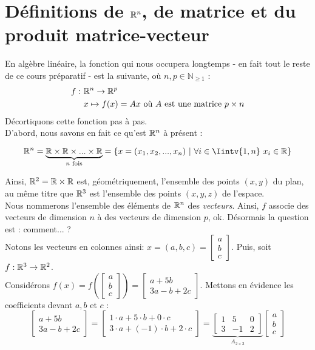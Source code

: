\section{Définitions de $\R^n$, de matrice et du produit matrice-vecteur}
\label{definitionProduitMatVec}
\noindent En algèbre linéaire, la fonction qui nous occupera longtemps - en fait tout le reste de ce cours préparatif - est la suivante, où $n,p \in \mathbb{N}_{\geq 1}$ :
\begin{align*}
    f: \ &\mathbb{R}^n \to \mathbb{R}^p\\
    &x \mapsto f(x) = Ax \text{ où $A$ est une matrice } p \times n
\end{align*}
Décortiquons cette fonction pas à pas.\\
D'abord, nous savons en fait ce qu'est $\R^n$ à présent : 
\begin{boxdef}[Espace $\R^n$]
$$\R^n = \underbrace{\R \times \R \times ... \times \R}_{n \text{ fois}} = \{x=(x_1, x_2, ..., x_n) \ | \ \forall i \in \Iintv{1, n}\ x_i \in \R\}$$
\end{boxdef}
Ainsi, $\mathbb{R}^2 = \mathbb{R} \times \mathbb{R}$ est, géométriquement, l'ensemble des points $(x,y)$ du plan, au même titre que $\mathbb{R}^3$ est l'ensemble des points $(x,y,z)$ de l'espace.\\
Nous nommerons l'ensemble des éléments de $\R^n$ des \textit{vecteurs}. Ainsi, $f$ associe des vecteurs de dimension $n$ à des vecteurs de dimension $p$, ok. Désormais la question est : comment... ?\\
Notons les vecteurs en colonnes ainsi: $x = (a,b,c) = \begin{bmatrix}a \\ b \\ c \end{bmatrix}$. Puis, soit $f: \mathbb{R}^3 \to \mathbb{R}^2$.\\
Considérons $f(x) = f\left(\begin{bmatrix}a \\ b \\ c \end{bmatrix} \right) = \begin{bmatrix}a+5b \\ 3a-b+2c \end{bmatrix}$. Mettons en évidence les coefficients devant $a, b$ et $c$ :
$$\begin{bmatrix}a+5b \\ 3a-b+2c \end{bmatrix} = \begin{bmatrix}1 \cdot a+5\cdot b + 0 \cdot c \\ 3 \cdot a + (-1) \cdot b+2 \cdot c \end{bmatrix} = \underbrace{\begin{bmatrix} 1 & 5 & 0 \\3 & -1 & 2 \end{bmatrix}}_{A_{2 \times 3}} \begin{bmatrix}a \\ b \\ c \end{bmatrix}
$$
